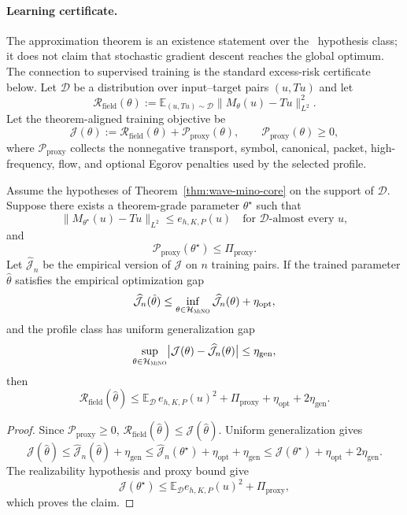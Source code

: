 \paragraph{Learning certificate.}
The approximation theorem is an existence statement over the \MiNO\ hypothesis class; it does not claim that stochastic gradient descent reaches the global optimum.  The connection to supervised training is the standard excess-risk certificate below.  Let $\mathcal D$ be a distribution over input--target pairs $(u,Tu)$ and let
\[
\mathcal R_{\mathrm{field}}(\theta)
:=
\mathbb E_{(u,Tu)\sim\mathcal D}
\|M_\theta(u)-Tu\|_{L^2}^2 .
\]
Let the theorem-aligned training objective be
\[
\mathcal J(\theta)
:=
\mathcal R_{\mathrm{field}}(\theta)
+
\mathcal P_{\mathrm{proxy}}(\theta),
\qquad
\mathcal P_{\mathrm{proxy}}(\theta)\ge0,
\]
where $\mathcal P_{\mathrm{proxy}}$ collects the nonnegative transport, symbol, canonical, packet, high-frequency, flow, and optional Egorov penalties used by the selected profile.

\begin{proposition}
\label{prop:learning-certificate}
Assume the hypotheses of Theorem~\ref{thm:wave-mino-core} on the support of $\mathcal D$.  Suppose there exists a theorem-grade parameter $\theta^\star$ such that
\[
\|M_{\theta^\star}(u)-Tu\|_{L^2}
\le
e_{h,K,P}(u)
\quad
\text{for } \mathcal D\text{-almost every }u,
\]
and
\[
\mathcal P_{\mathrm{proxy}}(\theta^\star)\le \Pi_{\mathrm{proxy}} .
\]
Let $\widehat{\mathcal J}_n$ be the empirical version of $\mathcal J$ on $n$ training pairs.  If the trained parameter $\hat\theta$ satisfies the empirical optimization gap
\[
\widehat{\mathcal J}_n(\hat\theta)
\le
\inf_{\theta\in\mathcal H_{\textsc{MiNO}}}\widehat{\mathcal J}_n(\theta)
+
\eta_{\mathrm{opt}},
\]
and the profile class has uniform generalization gap
\[
\sup_{\theta\in\mathcal H_{\textsc{MiNO}}}
\bigl|\mathcal J(\theta)-\widehat{\mathcal J}_n(\theta)\bigr|
\le
\eta_{\mathrm{gen}},
\]
then
\[
\mathcal R_{\mathrm{field}}(\hat\theta)
\le
\mathbb E_{\mathcal D}\, e_{h,K,P}(u)^2
+
\Pi_{\mathrm{proxy}}
+
\eta_{\mathrm{opt}}
+
2\eta_{\mathrm{gen}} .
\]
\end{proposition}

\begin{proof}
Since $\mathcal P_{\mathrm{proxy}}\ge0$, $\mathcal R_{\mathrm{field}}(\hat\theta)\le \mathcal J(\hat\theta)$.  Uniform generalization gives
\[
\mathcal J(\hat\theta)
\le
\widehat{\mathcal J}_n(\hat\theta)+\eta_{\mathrm{gen}}
\le
\widehat{\mathcal J}_n(\theta^\star)+\eta_{\mathrm{opt}}+\eta_{\mathrm{gen}}
\le
\mathcal J(\theta^\star)+\eta_{\mathrm{opt}}+2\eta_{\mathrm{gen}}.
\]
The realizability hypothesis and proxy bound give
\[
\mathcal J(\theta^\star)
\le
\mathbb E_{\mathcal D} e_{h,K,P}(u)^2+\Pi_{\mathrm{proxy}},
\]
which proves the claim.
\end{proof}

